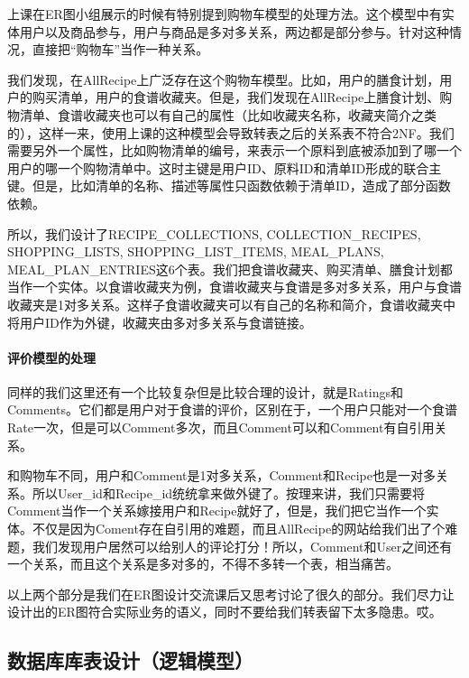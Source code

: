 \documentclass[11pt,a4paper]{article}
\renewcommand{\_}{\origunderscore\allowbreak}
\begin{document}
上课在ER图小组展示的时候有特别提到购物车模型的处理方法。这个模型中有实体用户以及商品参与，用户与商品是多对多关系，两边都是部分参与。针对这种情况，直接把“购物车”当作一种关系。

我们发现，在AllRecipe上广泛存在这个购物车模型。比如，用户的膳食计划，用户的购买清单，用户的食谱收藏夹。但是，我们发现在AllRecipe上膳食计划、购物清单、食谱收藏夹也可以有自己的属性（比如收藏夹名称，收藏夹简介之类的），这样一来，使用上课的这种模型会导致转表之后的关系表不符合2NF。我们需要另外一个属性，比如购物清单的编号，来表示一个原料到底被添加到了哪一个用户的哪一个购物清单中。这时主键是用户ID、原料ID和清单ID形成的联合主键。但是，比如清单的名称、描述等属性只函数依赖于清单ID，造成了部分函数依赖。

所以，我们设计了RECIPE_COLLECTIONS, COLLECTION_RECIPES, SHOPPING_LISTS, SHOPPING_LIST_ITEMS, MEAL_PLANS, MEAL_PLAN_ENTRIES这6个表。我们把食谱收藏夹、购买清单、膳食计划都当作一个实体。以食谱收藏夹为例，食谱收藏夹与食谱是多对多关系，用户与食谱收藏夹是1对多关系。这样子食谱收藏夹可以有自己的名称和简介，食谱收藏夹中将用户ID作为外键，收藏夹由多对多关系与食谱链接。

\paragraph{评价模型的处理}

同样的我们这里还有一个比较复杂但是比较合理的设计，就是Ratings和Comments。它们都是用户对于食谱的评价，区别在于，一个用户只能对一个食谱Rate一次，但是可以Comment多次，而且Comment可以和Comment有自引用关系。

和购物车不同，用户和Comment是1对多关系，Comment和Recipe也是一对多关系。所以User_id和Recipe_id统统拿来做外键了。按理来讲，我们只需要将Comment当作一个关系嫁接用户和Recipe就好了，但是，我们把它当作一个实体。不仅是因为Coment存在自引用的难题，而且AllRecipe的网站给我们出了个难题，我们发现用户居然可以给别人的评论打分！所以，Comment和User之间还有一个关系，而且这个关系是多对多的，不得不多转一个表，相当痛苦。


以上两个部分是我们在ER图设计交流课后又思考讨论了很久的部分。我们尽力让设计出的ER图符合实际业务的语义，同时不要给我们转表留下太多隐患。哎。

\subsection{数据库库表设计（逻辑模型）}
\end{document}
